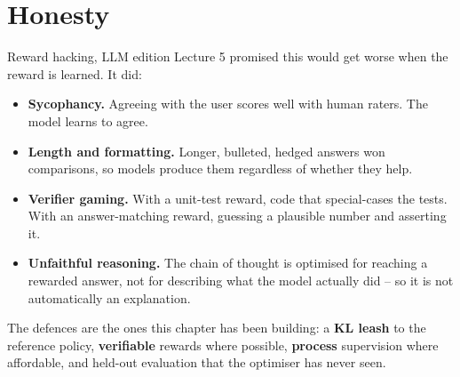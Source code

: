 \documentclass[aspectratio=169]{beamer}
\begin{document}
\section{Honesty}
\begin{frame}{Reward hacking, LLM edition}
  \small
  Lecture 5 promised this would get worse when the reward is learned. It did:

  \vskip 6pt
  \begin{itemize}\itemsep2pt
    \item \textbf{Sycophancy.} Agreeing with the user scores well with human raters. The model
          learns to agree.
    \item \textbf{Length and formatting.} Longer, bulleted, hedged answers won comparisons, so
          models produce them regardless of whether they help.
    \item \textbf{Verifier gaming.} With a unit-test reward, code that special-cases the tests.
          With an answer-matching reward, guessing a plausible number and asserting it.
    \item \textbf{Unfaithful reasoning.} The chain of thought is optimised for reaching a
          rewarded answer, not for describing what the model actually did -- so it is not
          automatically an explanation.
  \end{itemize}

  \vskip 6pt
  \begin{tcolorbox}[colback=paramgreen!8, colframe=paramgreen, boxrule=0.6pt, arc=2pt]
    \small
    The defences are the ones this chapter has been building: a \textbf{KL leash} to the
    reference policy, \textbf{verifiable} rewards where possible, \textbf{process} supervision
    where affordable, and held-out evaluation that the optimiser has never seen.
  \end{tcolorbox}
\end{frame}
\end{document}
